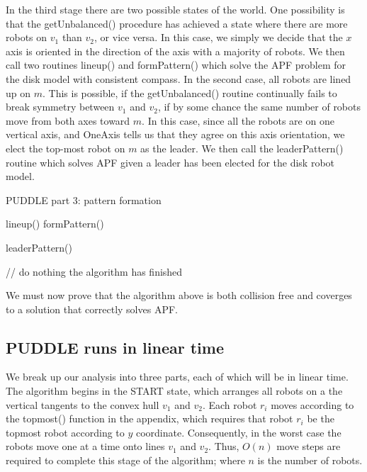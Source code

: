 \documentclass[preprint,10pt]{elsarticle}
\begin{document}
	In the third stage there are two possible states of the world. One possibility is that the getUnbalanced() procedure
	has achieved a state where there are more robots on $v_1$ than $v_2$, or vice versa. In
	this case, we simply we decide that the $x$ axis is oriented in the direction of the axis with a majority
	of robots. We then call two routines lineup() and formPattern() which solve the APF problem for the disk 
	model with consistent compass. In the second case, all robots are lined up on $m$. This is possible, if
	the getUnbalanced() routine continually fails to break symmetry between $v_1$ and $v_2$, if by some
	chance the same number of robots move from both axes toward $m$. In this case, since all the robots
	are on one vertical axis, and OneAxis tells us that they agree on this axis orientation, we elect
	the top-most robot on $m$ as the leader. We then call the leaderPattern() routine which solves
	APF given a leader has been elected for the disk robot model.
	
	\begin{algorithm}[H]
	\begin{algorithmic}
		\caption{PUDDLE part 3: pattern formation}

			\State
				\State lineup()
				\State formPattern()
			\EndCase

			\State
				\State leaderPattern()
			\EndCase

			\State
				\State // do nothing the algorithm has finished
			\EndCase
		\EndSwitch

	\EndProcedure
	\end{algorithmic}
	\end{algorithm}
	
	We must now prove that the algorithm above is both collision free and coverges to a solution
	that correctly solves APF.
	\subsection{PUDDLE runs in linear time} 
		We break up our analysis into three parts, each of which will be in linear time. The algorithm
		begins in the START state, which arranges all robots on a the vertical tangents to the convex
		hull $v_1$ and $v_2$. Each robot $r_i$ moves according to the topmost() function in the appendix, which requires
		that robot $r_i$ be the topmost robot according to $y$ coordinate. Consequently, in the worst case 
		the robots move one	at a time onto lines $v_1$ and $v_2$. Thus, $O(n)$ move steps are required to 
		complete this stage of the algorithm; where $n$ is the number of robots.
\end{document}
